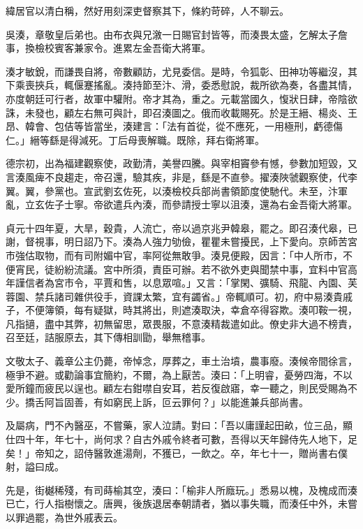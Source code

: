 \begin{pinyinscope}
 緯居官以清白稱，然好用刻深吏督察其下，條約苛碎，人不聊云。



 吳湊，章敬皇后弟也。由布衣與兄漵一日賜官封皆等，而湊畏太盛，乞解太子詹事，換檢校賓客兼家令。進累左金吾衛大將軍。



 湊才敏銳，而謙畏自將，帝數顧訪，尤見委信。是時，令狐彰、田神功等繼沒，其下乘喪挾兵，輒偃蹇搖亂。湊持節至汴、滑，委悉慰說，裁所欲為奏，各盡其情，亦度朝廷可行者，故軍中驩附。帝才其為，重之。元載當國久，愎狀日肆，帝陰欲誅，未發也，顧左右無可與計，即召湊圖之。俄而收載賜死。於是王縉、楊炎、王昂、韓會、包佶等皆當坐，湊建言：「法有首從，從不應死，一用極刑，虧德傷仁。」縉等繇是得減死。丁后母喪解職。既除，拜右衛將軍。



 德宗初，出為福建觀察使，政勤清，美譽四騰。與宰相竇參有憾，參數加短毀，又言湊風痺不良趨走，帝召還，驗其疾，非是，繇是不直參。擢湊陜虢觀察使，代李翼。翼，參黨也。宣武劉玄佐死，以湊檢校兵部尚書領節度使馳代。未至，汴軍亂，立玄佐子士寧。帝欲遣兵內湊，而參請授士寧以沮湊，還為右金吾衛大將軍。



 貞元十四年夏，大旱，穀貴，人流亡，帝以過京兆尹韓皋，罷之。即召湊代皋，已謝，督視事，明日詔乃下。湊為人強力劬儉，瞿瞿未嘗擾民，上下愛向。京師苦宮市強估取物，而有司附媚中官，率阿從無敢爭。湊見便殿，因言：「中人所市，不便宵民，徒紛紛流議。宮中所須，責臣可辦。若不欲外吏與聞禁中事，宜料中官高年謹信者為宮市令，平賈和售，以息眾喧。」又言：「掌閑、彍騎、飛龍、內園、芙蓉園、禁兵諸司雜供役手，資課太繁，宜有蠲省。」帝輒順可。初，府中易湊貴戚子，不便簿領，每有疑獄，時其將出，則遮湊取決，幸倉卒得容欺。湊叩鞍一視，凡指擿，盡中其弊，初無留思，眾畏服，不意湊精裁遣如此。僚史非大過不榜責，召至廷，詰服原去，其下傳相訓勖，舉無稽事。



 文敬太子、義章公主仍薨，帝悼念，厚葬之，車土治墳，農事廢。湊候帝間徐言，極爭不避。或勸論事宜簡約，不爾，為上厭苦。湊曰：「上明睿，憂勞四海，不以愛所鐘而疲民以逞也。顧左右鉗噤自安耳，若反復啟寤，幸一聽之，則民受賜為不少。撟舌阿旨固善，有如窮民上訴，叵云罪何？」以能進兼兵部尚書。



 及屬病，門不內醫巫，不嘗藥，家人泣請。對曰：「吾以庸謹起田畝，位三品，顯仕四十年，年七十，尚何求？自古外戚令終者可數，吾得以天年歸侍先人地下，足矣！」帝知之，詔侍醫敦進湯劑，不獲已，一飲之。卒，年七十一，贈尚書右僕射，謚曰成。



 先是，街樾稀殘，有司蒔榆其空，湊曰：「榆非人所廕玩。」悉易以槐，及槐成而湊已亡，行人指樹懷之。唐興，後族退居奉朝請者，猶以事失職，而湊任中外，未嘗以罪過罷，為世外戚表云。




\end{pinyinscope}
